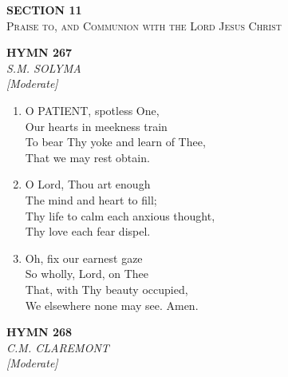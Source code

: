 \newpage
\thispagestyle{empty}
\vspace*{3.5cm}
\begin{center}
    {\LARGE \textbf{SECTION 11}}\\[0.8em]
    {\Large \textsc{Praise to, and Communion with the Lord Jesus Christ}}
\end{center}
\vspace{3.5cm}

\newpage
\begin{center}
    {\Large \textbf{HYMN 267}}
    \\
    \textit{S.M. SOLYMA}
    \\
    \textit{\small [Moderate]}
\end{center}
\vspace{1em}

\begin{enumerate}
    \item O PATIENT, spotless One, \\
        Our hearts in meekness train \\
        To bear Thy yoke and learn of Thee, \\
        That we may rest obtain.

    \item O Lord, Thou art enough \\
        The mind and heart to fill; \\
        Thy life to calm each anxious thought, \\
        Thy love each fear dispel.

    \item Oh, fix our earnest gaze \\
        So wholly, Lord, on Thee \\
        That, with Thy beauty occupied, \\
        We elsewhere none may see. Amen.

\end{enumerate}

\newpage
\begin{center}
    {\Large \textbf{HYMN 268}}
    \\
    \textit{C.M. CLAREMONT}
    \\
    \textit{\small [Moderate]}
\end{center}
\vspace{1em}

